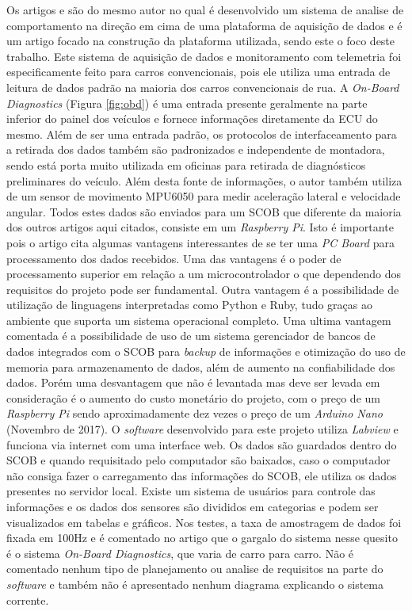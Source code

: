 Os artigos \cite{designAndImplementation2015} e \cite{developmentOfAn2016} são do mesmo autor no qual \cite{developmentOfAn2016} é desenvolvido um sistema de analise de comportamento na direção em cima de uma plataforma de aquisição de dados e \cite{designAndImplementation2015} é um artigo focado na construção da plataforma utilizada, sendo este o foco deste trabalho. Este sistema de aquisição de dados e monitoramento com telemetria foi especificamente feito para carros convencionais, pois ele utiliza uma entrada de leitura de dados padrão na maioria dos carros convencionais de rua. A \textit{On-Board Diagnostics} (Figura \ref{fig:obd}) é uma entrada presente geralmente na parte inferior do painel dos veículos e fornece informações diretamente da ECU do mesmo. Além de ser uma entrada padrão, os protocolos de interfaceamento para a retirada dos dados também são padronizados e independente de montadora, sendo está porta muito utilizada em oficinas para retirada de diagnósticos preliminares do veículo. Além desta fonte de informações, o autor também utiliza de um sensor de movimento MPU6050 para medir aceleração lateral e velocidade angular. Todos estes dados são enviados para um SCOB que diferente da maioria dos outros artigos aqui citados, consiste em um \textit{Raspberry Pi}. Isto é importante pois o artigo cita algumas vantagens interessantes de se ter uma \textit{PC Board} para processamento dos dados recebidos. Uma das vantagens é o poder de processamento superior em relação a um microcontrolador o que dependendo dos requisitos do projeto pode ser fundamental. Outra vantagem é a possibilidade de utilização de linguagens interpretadas como Python e Ruby, tudo graças ao ambiente que suporta um sistema operacional completo. Uma ultima vantagem comentada é a possibilidade de uso de um sistema gerenciador de bancos de dados integrados com o SCOB para \textit{backup} de informações e otimização do uso de memoria para armazenamento de dados, além de aumento na confiabilidade dos dados. Porém uma desvantagem que não é levantada mas deve ser levada em consideração é o aumento do custo monetário do projeto, com o preço de um \textit{Raspberry Pi} sendo aproximadamente dez vezes o preço de um \textit{Arduino Nano} (Novembro de 2017). O \textit{software} desenvolvido para este projeto utiliza \textit{Labview} e funciona via internet com uma interface web. Os dados são guardados dentro do SCOB e quando requisitado pelo computador são baixados, caso o computador não consiga fazer o carregamento das informações do SCOB, ele utiliza os dados presentes no servidor local. Existe um sistema de usuários para controle das informações e os dados dos sensores são divididos em categorias e podem ser visualizados em tabelas e gráficos. Nos testes, a taxa de amostragem de dados foi fixada em 100Hz e é comentado no artigo que o gargalo do sistema nesse quesito é o sistema \textit{On-Board Diagnostics}, que varia de carro para carro. Não é comentado nenhum tipo de planejamento ou analise de requisitos na parte do \textit{software} e também não é apresentado nenhum diagrama explicando o sistema corrente.    

